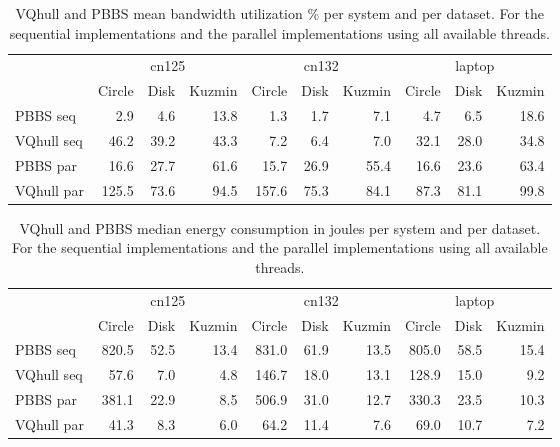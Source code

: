 \documentclass{cas-sc}
\begin{document}
\begin{table}
  \centering
  \begin{tabular}{lrrrrrrrrr}
    & \multicolumn{3}{c}{cn125} & \multicolumn{3}{c}{cn132} & \multicolumn{3}{c}{laptop} \\
    & Circle & Disk & Kuzmin & Circle & Disk & Kuzmin & Circle & Disk & Kuzmin \\\midrule
    PBBS seq & 2.9 & 4.6 & 13.8 & 1.3 & 1.7 & 7.1 & 4.7 & 6.5 & 18.6 \\
    VQhull seq & 46.2 & 39.2 & 43.3 & 7.2 & 6.4 & 7.0 & 32.1 & 28.0 & 34.8 \\
    PBBS par & 16.6 & 27.7 & 61.6 & 15.7 & 26.9 & 55.4 & 16.6 & 23.6 & 63.4 \\
    VQhull par & 125.5 & 73.6 & 94.5 & 157.6 & 75.3 & 84.1 & 87.3 & 81.1 & 99.8 \\
  \end{tabular}
  \caption{VQhull and PBBS mean bandwidth utilization \si{\percent} per system
  and per dataset. For the sequential implementations and the parallel
  implementations using all available threads.}
\end{table}

\begin{table}
  \centering
  \begin{tabular}{lrrrrrrrrr}
    & \multicolumn{3}{c}{cn125} & \multicolumn{3}{c}{cn132} & \multicolumn{3}{c}{laptop} \\
    & Circle & Disk & Kuzmin & Circle & Disk & Kuzmin & Circle & Disk & Kuzmin \\\midrule
    PBBS seq & 820.5 & 52.5 & 13.4 & 831.0 & 61.9 & 13.5 & 805.0 & 58.5 & 15.4 \\
    VQhull seq & 57.6 & 7.0 & 4.8 & 146.7 & 18.0 & 13.1 & 128.9 & 15.0 & 9.2 \\
    PBBS par & 381.1 & 22.9 & 8.5 & 506.9 & 31.0 & 12.7 & 330.3 & 23.5 & 10.3 \\
    VQhull par & 41.3 & 8.3 & 6.0 & 64.2 & 11.4 & 7.6 & 69.0 & 10.7 & 7.2 \\
  \end{tabular}
  \caption{VQhull and PBBS median energy consumption in joules per system and
  per dataset. For the sequential implementations and the parallel
  implementations using all available threads.}
\end{table}
\end{document}
